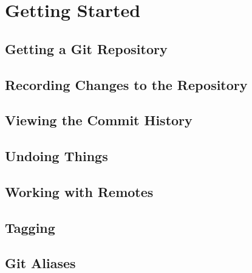 \section{Getting Started}


\subsection{Getting a Git Repository}
\begin{frame}[t]{}
\end{frame}
\subsection{Recording Changes to the Repository}
\begin{frame}[t]{}
\end{frame}
\subsection{Viewing the Commit History}
\begin{frame}[t]{}
\end{frame}
\subsection{Undoing Things}
\begin{frame}[t]{}
\end{frame}
\subsection{Working with Remotes}
\begin{frame}[t]{}
\end{frame}
\subsection{Tagging}
\begin{frame}[t]{}
\end{frame}
\subsection{Git Aliases}
\begin{frame}[t]{}
\end{frame}

\begin{frame}[t]{}
\end{frame}


